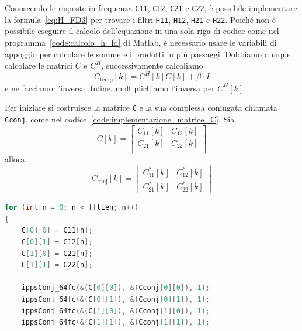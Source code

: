 \documentclass[12pt,a4paper,titlepage]{article}
\begin{document}
Conoscendo le risposte in frequenza \texttt{C11}, \texttt{C12}, \texttt{C21} e \texttt{C22}, è possibile implementare la formula~\eqref{eq:H_FD3} per trovare i filtri \texttt{H11}, \texttt{H12}, \texttt{H21} e \texttt{H22}. Poiché non è possibile eseguire il calcolo dell'equazione in una sola riga di codice come nel programma~\ref{code:calcolo_h_fd} di Matlab, è necessario usare le variabili di appoggio per calcolare le somme e i prodotti in più passaggi. Dobbiamo dunque calcolare le matrici $C$ e $C^H$, successivamente calcoliamo 
\begin{equation}\label{eq:Ctemp}
C_{\text{temp}}[k] = C^H[k] C[k] + \beta \cdot I
\end{equation}
e ne facciamo l'inversa. Infine, moltiplichiamo l'inversa per $C^H[k]$. 

Per iniziare si costruisce la matrice \texttt{C} e la sua complessa coniugata chiamata \texttt{Cconj}, come nel codice~\ref{code:implementazione_matrice_C}. Sia 
\begin{equation*}
C[k] = 
\begin{bmatrix}
C_{11}[k] & C_{12}[k]\\
C_{21}[k] & C_{22}[k]\\
\end{bmatrix}
\end{equation*}
allora
\begin{equation}\label{eq:c_conj}
C_{\text{conj}}[k] = 
\begin{bmatrix}
C_{11}^*[k] & C_{12}^*[k]\\
C_{21}^*[k] & C_{22}^*[k]
\end{bmatrix}
\end{equation}

\begin{lstlisting}[language=cpp, label=code:implementazione_matrice_C, caption = Implementazione della matrice \texttt{C} e \texttt{Cconj}, breaklines = false, captionpos = b]
for (int n = 0; n < fftLen; n++)
{
	C[0][0] = C11[n];
	C[0][1] = C12[n];
	C[1][0] = C21[n];
	C[1][1] = C22[n];
	
	ippsConj_64fc(&(C[0][0]), &(Cconj[0][0]), 1);
	ippsConj_64fc(&(C[0][1]), &(Cconj[0][1]), 1);
	ippsConj_64fc(&(C[1][0]), &(Cconj[1][0]), 1);
	ippsConj_64fc(&(C[1][1]), &(Cconj[1][1]), 1);
\end{lstlisting}
\end{document}
